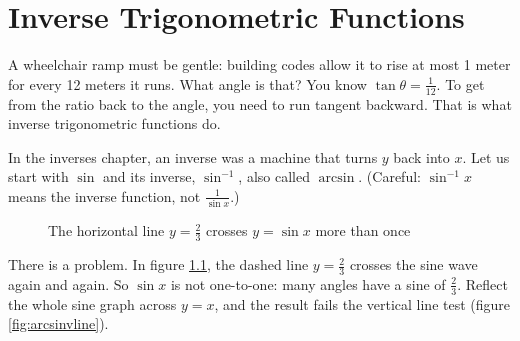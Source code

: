 \chapter{Inverse Trigonometric Functions}

A wheelchair ramp must be gentle: building codes allow it to rise at most
1 meter for every 12 meters it runs. What angle is that? You know
$\tan\theta = \frac{1}{12}$. To get from the ratio back to the angle, you
need to run tangent backward. That is what inverse trigonometric functions
do.

In the inverses chapter, an inverse was a machine that turns $y$ back into
$x$. Let us start with $\sin$ and
its inverse, $\sin^{-1}$, also called $\arcsin$. (Careful:
$\sin^{-1} x$ means the inverse function, not $\frac{1}{\sin x}$.)

\begin{center}
	\begin{figure}
	\centering
		\caption{The horizontal line $y=\frac{2}{3}$ crosses $y = \sin{x}$ more than once}
		\label{fig:sinhline}
	\end{figure}
\end{center}

There is a problem. In figure \ref{fig:sinhline}, the dashed line
$y = \frac{2}{3}$ crosses the sine wave again and again. So $\sin x$ is not
one-to-one: many angles have a sine of $\frac{2}{3}$. Reflect the whole
sine graph across $y = x$, and the result fails the vertical line test
(figure \ref{fig:arcsinvline}).

